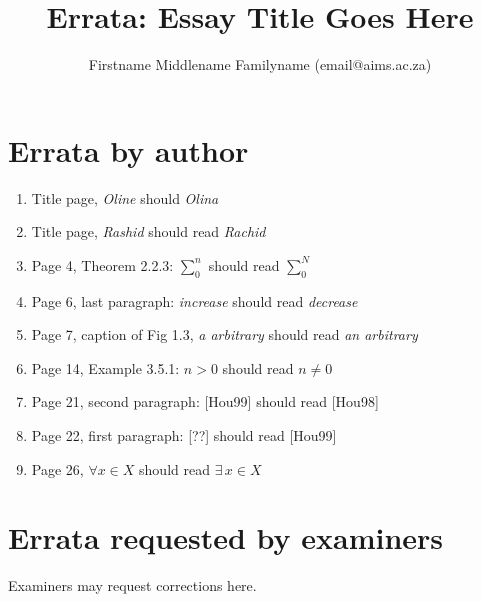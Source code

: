 \documentclass[11pt]{article}
\title{Errata: Essay Title Goes Here}
\author{Firstname Middlename Familyname (email@aims.ac.za)}
\date{}
\begin{document}
\maketitle
\section{Errata by author}
\begin{enumerate}
 \item Title page, \textit{Oline} should \textit{Olina}
 \item Title page, \textit{Rashid} should read \textit{Rachid}
 \item Page 4, Theorem 2.2.3: $\sum_0^n$ should read $\sum_0^N$
 \item Page 6, last paragraph: \textit{increase} should read \textit{decrease}
 \item Page 7,  caption of Fig 1.3, \textit{a arbitrary} 
   should read \textit{an arbitrary}
 \item Page 14, Example 3.5.1: $n>0$ should read $n\neq0$
 \item Page 21, second paragraph: [Hou99] should read [Hou98]
 \item Page 22, first paragraph: [??] should read [Hou99]
 \item Page 26, $\forall x\in X$ should read $\exists\, x\in X$
\end{enumerate}

\section{Errata requested by examiners}
Examiners may request corrections here.
\end{document}
